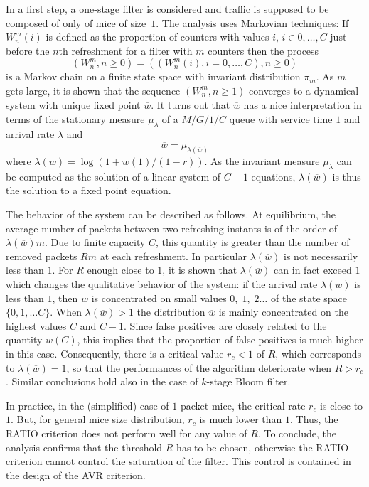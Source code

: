 \documentclass{amsart}
\begin{document}
 In a first step, a one-stage filter  is considered and traffic is supposed to be composed
 of only  of mice of size~$1$.  The  analysis uses Markovian techniques:  If $W_n^m(i)$ is
 defined as  the proportion of counters  with values $i$, $i  \in{0,\ldots,C}$ just before
 the $n$th refreshment for a filter with $m$ counters then the process
\[
\left(W_n^m,     n\geq
0\right)=\left(\left(W_n^m(i), i=0,\ldots,C\right),  n\geq 0\right)
\]
 is a Markov  chain on a finite  state space with invariant distribution  $\pi_m$.  As $m$
 gets large,  it is shown that the  sequence $\left(W_n^m, n\geq 1\right)$  converges to a
 dynamical system with  unique fixed point $\overline w$. It turns  out that $\overline w$
 has  a nice  interpretation  in terms  of  the stationary  measure  $\mu_{\lambda}$ of  a
 $M/G/1/C$ queue with service time $1$ and arrival rate $\lambda$ and
\[
\overline  w=\mu_{\lambda(\overline  w)}
\]
where $\lambda(w)=\log(1+w(1)/(1-r))$.   As the  invariant measure $\mu_{\lambda}$  can be
computed as the solution of a linear system of $C+1$ equations, $\lambda(\overline{w})$ is
thus the solution to a fixed point equation.

The behavior of the system can be described as follows. At equilibrium, the average number
of  packets between  two refreshing  instants is  of the  order  of $\lambda(\overline{w})
m$.  Due to  finite capacity  $C$, this  quantity is  greater than  the number  of removed
packets  $Rm$   at  each  refreshment.   In  particular   $\lambda(\overline{w})$  is  not
necessarily   less  than   $1$.  For   $R$  enough   close  to   $1$,  it   is   shown  that
$\lambda(\overline{w})$ can in  fact exceed $1$ which changes  the qualitative behavior of
the  system:  if  the  arrival   rate  $\lambda(\overline{w})$  is  less  than  $1$,  then
$\overline{w}$  is concentrated  on  small  values $0,\;1,\;2\ldots$  of  the state  space
$\{0,1,\ldots  C\}$.  When  $\lambda(\overline{w})>1$ the  distribution  $\overline{w}$ is
mainly concentrated on the highest values $C$ and $C-1$. Since false positives are closely
related  to the  quantity $\overline{w}(C)$,  this implies  that the  proportion  of false
positives is much higher in this case.  Consequently, there is a critical value $r_c<1$ of
$R$,  which corresponds  to  $\lambda(\overline{w})=1$,  so that  the  performances of the
algorithm  deteriorate when $R>r_c$. Similar conclusions hold also in the case of
$k$-stage Bloom filter. 


In practice, in the (simplified) case of $1$-packet mice, the critical rate $r_c$ is close
to $1$. But, for general mice size distribution, $r_c$ is much lower than $1$. Thus, the
RATIO criterion does not perform well for any value of $R$. To conclude, the analysis
confirms that the threshold $R$ has to be chosen, otherwise the RATIO criterion cannot
control the saturation of the filter. This control is contained in the  design of the AVR
criterion. 
\end{document}
